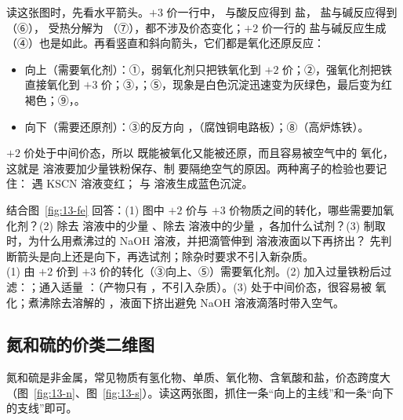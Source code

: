 读这张图时，先看水平箭头。$+3$ 价一行中， 与酸反应得到  盐， 盐与碱反应得到 （⑥）， 受热分解为 （⑦），都不涉及价态变化；$+2$ 价一行的  盐与碱反应生成 （④）也是如此。再看竖直和斜向箭头，它们都是氧化还原反应：
\begin{itemize}
\item 向上（需要氧化剂）：①，弱氧化剂只把铁氧化到 $+2$ 价；②，强氧化剂把铁直接氧化到 $+3$ 价；③，；⑤，现象是白色沉淀迅速变为灰绿色，最后变为红褐色；⑨，。
\item 向下（需要还原剂）：③的反方向 ，（腐蚀铜电路板）；⑧（高炉炼铁）。
\end{itemize}
$+2$ 价处于中间价态，所以  既能被氧化又能被还原，而且容易被空气中的  氧化，这就是  溶液要加少量铁粉保存、制  要隔绝空气的原因。两种离子的检验也要记住： 遇 KSCN 溶液变红； 与  溶液生成蓝色沉淀。

\begin{liti}[基础\quad 原创]
结合图~\ref{fig:13-fe} 回答：(1) 图中 $+2$ 价与 $+3$ 价物质之间的转化，哪些需要加氧化剂？(2) 除去  溶液中的少量 、除去  溶液中的少量 ，各加什么试剂？(3) 制取  时，为什么用煮沸过的 NaOH 溶液，并把滴管伸到  溶液液面以下再挤出？
\tcblower
\silu 先判断箭头是向上还是向下，再选试剂；除杂时要求不引入新杂质。\\
\jie (1) 由 $+2$ 价到 $+3$ 价的转化（③向上、⑤）需要氧化剂。(2) 加入过量铁粉后过滤：；通入适量 ：（产物只有 ，不引入杂质）。(3)  处于中间价态，很容易被  氧化；煮沸除去溶解的 ，液面下挤出避免 NaOH 溶液滴落时带入空气。
\end{liti}

\subsection{氮和硫的价类二维图}
氮和硫是非金属，常见物质有氢化物、单质、氧化物、含氧酸和盐，价态跨度大（图~\ref{fig:13-n}、图~\ref{fig:13-s}）。读这两张图，抓住一条“向上的主线”和一条“向下的支线”即可。

